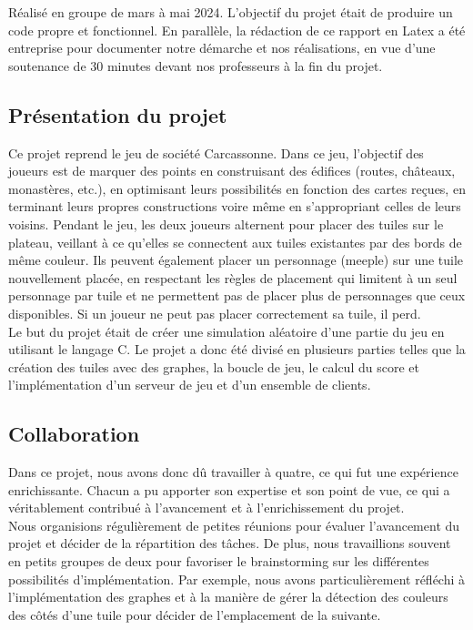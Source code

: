 \documentclass[dvipsnames]{rapportCS}
\begin{document}
Réalisé en groupe de mars à mai 2024. L'objectif du projet était de produire un code propre et fonctionnel. En parallèle, la rédaction de ce rapport en Latex a été entreprise pour documenter notre démarche et nos réalisations, en vue d'une soutenance de 30 minutes devant nos professeurs à la fin du projet.


\subsection{Présentation du projet}

Ce projet reprend le jeu de société Carcassonne. Dans ce jeu, l'objectif des joueurs est de marquer des points en construisant des édifices (routes, châteaux, monastères, etc.), en optimisant leurs possibilités en fonction des cartes reçues, en terminant leurs propres constructions voire même en s'appropriant celles de leurs voisins. Pendant le jeu, les deux joueurs alternent pour placer des tuiles sur le plateau, veillant à ce qu'elles se connectent aux tuiles existantes par des bords de même couleur. Ils peuvent également placer un personnage (meeple) sur une tuile nouvellement placée, en respectant les règles de placement qui limitent à un seul personnage par tuile et ne permettent pas de placer plus de personnages que ceux disponibles. Si un joueur ne peut pas placer correctement sa tuile, il perd.\\

Le but du projet était de créer une simulation aléatoire d'une partie du jeu en utilisant le langage C. Le projet a donc été divisé en plusieurs parties telles que la création des tuiles avec des graphes, la boucle de jeu, le calcul du score et l'implémentation d'un serveur de jeu et d'un ensemble de clients.

\subsection{Collaboration}

Dans ce projet, nous avons donc dû travailler à quatre, ce qui fut une expérience enrichissante. Chacun a pu apporter son expertise et son point de vue, ce qui a véritablement contribué à l'avancement et à l'enrichissement du projet.\\

Nous organisions régulièrement de petites réunions pour évaluer l'avancement du projet et décider de la répartition des tâches. De plus, nous travaillions souvent en petits groupes de deux pour favoriser le brainstorming sur les différentes possibilités d'implémentation. Par exemple, nous avons particulièrement réfléchi à l'implémentation des graphes et à la manière de gérer la détection des couleurs des côtés d'une tuile pour décider de l'emplacement de la suivante.\\
\end{document}
